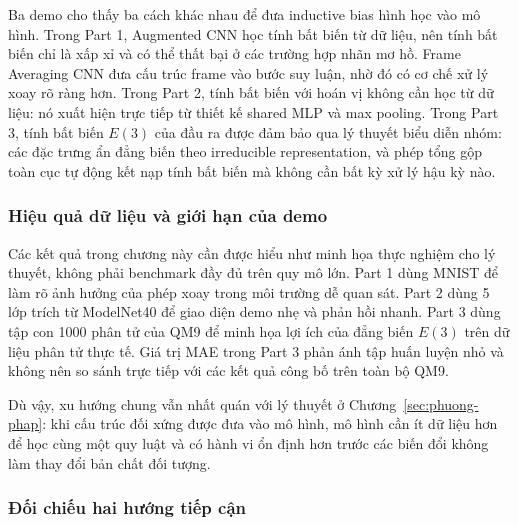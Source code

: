 Ba demo cho thấy ba cách khác nhau để đưa inductive bias hình học vào mô hình. Trong Part 1, Augmented CNN học tính bất biến từ dữ liệu, nên tính bất biến chỉ là xấp xỉ và có thể thất bại ở các trường hợp nhãn mơ hồ. Frame Averaging CNN đưa cấu trúc frame vào bước suy luận, nhờ đó có cơ chế xử lý xoay rõ ràng hơn. Trong Part 2, tính bất biến với hoán vị không cần học từ dữ liệu: nó xuất hiện trực tiếp từ thiết kế shared MLP và max pooling. Trong Part 3, tính bất biến $E(3)$ của đầu ra được đảm bảo qua lý thuyết biểu diễn nhóm: các đặc trưng ẩn đẳng biến theo irreducible representation, và phép tổng gộp toàn cục tự động kết nạp tính bất biến mà không cần bất kỳ xử lý hậu kỳ nào.

\subsubsection{Hiệu quả dữ liệu và giới hạn của demo}

Các kết quả trong chương này cần được hiểu như minh họa thực nghiệm cho lý thuyết, không phải benchmark đầy đủ trên quy mô lớn. Part 1 dùng MNIST để làm rõ ảnh hưởng của phép xoay trong môi trường dễ quan sát. Part 2 dùng 5 lớp trích từ ModelNet40 để giao diện demo nhẹ và phản hồi nhanh. Part 3 dùng tập con 1000 phân tử của QM9 để minh họa lợi ích của đẳng biến $E(3)$ trên dữ liệu phân tử thực tế. Giá trị MAE trong Part 3 phản ánh tập huấn luyện nhỏ và không nên so sánh trực tiếp với các kết quả công bố trên toàn bộ QM9.

Dù vậy, xu hướng chung vẫn nhất quán với lý thuyết ở Chương~\ref{sec:phuong-phap}: khi cấu trúc đối xứng được đưa vào mô hình, mô hình cần ít dữ liệu hơn để học cùng một quy luật và có hành vi ổn định hơn trước các biến đổi không làm thay đổi bản chất đối tượng.

\subsubsection{Đối chiếu hai hướng tiếp cận}

